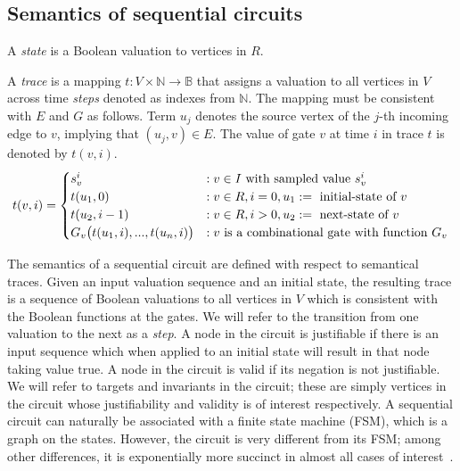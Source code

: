 \subsection{Semantics of sequential circuits}
\label{s:back:crct_semantics}

\begin{definition}[State]
\rm A {\em state} is a Boolean valuation to vertices in $R$. 
\end{definition}

\begin{definition}[Trace]
\rm A {\em trace} is a mapping $t: V \times \mathbb{N} \rightarrow
\mathbb{B}$ that assigns a valuation to all vertices in
$V$ across time {\em steps} denoted as indexes from
$\mathbb{N}$.  The mapping must be consistent with $E$ and
$G$ as follows.  Term $u_{j}$ denotes the source vertex of
the $j$-th incoming edge to $v$, implying that
$(u_{j},v)\in E$.  The value of gate $v$ at time $i$ in
trace $t$ is denoted by $t(v,i)$.
\[
t(v,i)=
   \begin{cases}
      s^i_{v}            &:v \in I \ \text{with sampled value $s_{v}^i$}\\
      t(u_1, 0)       &:v \in R,i=0,u_1:=\ \text{initial-state of $v$}\\
      t(u_2, i-1)        &:v \in R,i>0,u_2:=\ \text{next-state of $v$}\\
      G_v\big(t(u_{1},i),...,t(u_{n},i)\big) &: v \ \text{is a combinational gate with function 
$G_v$}
   \end{cases} \\
\]
\end{definition}

The semantics of a sequential circuit are defined with
respect to semantical traces.  Given an input valuation
sequence and an initial state, the resulting trace is a
sequence of Boolean valuations to all vertices in $V$
which is consistent with the Boolean functions at the
gates.  We will refer to the transition from one valuation
to the next as a {\em step}.  A node in the circuit is
justifiable if there is an input sequence which when
applied to an initial state will result in that node
taking value $\mbox{true}$.  A node in the circuit is
valid if its negation is not justifiable.  We will refer
to targets and invariants in the circuit; these are simply
vertices in the circuit whose justifiability and validity
is of interest respectively.
A sequential circuit can naturally
be associated with a finite state machine (FSM),
which is a graph on the states.  However, the 
circuit is very different from its FSM; among
other differences, it is exponentially more succinct in
almost all cases of interest~\cite{BuClMcDiHw92}. 

